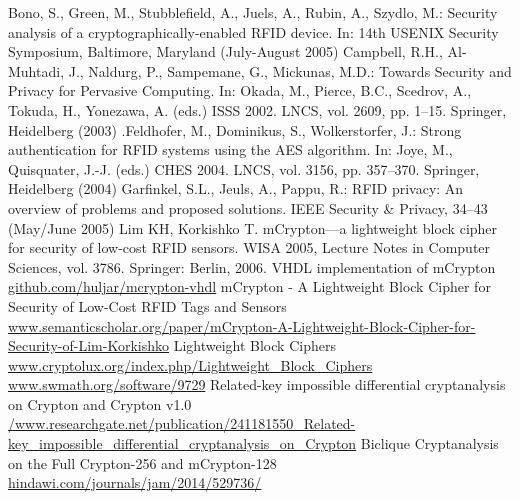 \documentclass{transcrypto}
\begin{document}
	\newpage
	\begin{thebibliography}{9}
		Bono, S., Green, M., Stubblefield, A., Juels, A., Rubin, A., Szydlo, M.: Security analysis of a cryptographically-enabled RFID device. In: 14th USENIX Security Symposium, Baltimore, Maryland (July-August 2005)
		Campbell, R.H., Al-Muhtadi, J., Naldurg, P., Sampemane, G., Mickunas, M.D.: Towards Security and Privacy for Pervasive Computing. In: Okada, M., Pierce, B.C., Scedrov, A., Tokuda, H., Yonezawa, A. (eds.) ISSS 2002. LNCS, vol. 2609, pp. 1–15. Springer, Heidelberg (2003)
		.Feldhofer, M., Dominikus, S., Wolkerstorfer, J.: Strong authentication for RFID systems using the AES algorithm. In: Joye, M., Quisquater, J.-J. (eds.) CHES 2004. LNCS, vol. 3156, pp. 357–370. Springer, Heidelberg (2004)
		Garfinkel, S.L., Jeuls, A., Pappu, R.: RFID privacy: An overview of problems and proposed solutions. IEEE Security \& Privacy, 34–43 (May/June 2005)
		Lim KH, Korkishko T. mCrypton—a lightweight block cipher for security of low-cost RFID sensors. WISA 2005, Lecture Notes in Computer Sciences, vol. 3786. Springer: Berlin, 2006. 
		VHDL implementation of mCrypton
		\href{https://github.com/huljar/mcrypton-vhdl}{github.com/huljar/mcrypton-vhdl}
		mCrypton - A Lightweight Block Cipher for Security of Low-Cost RFID Tags and Sensors
		\href{https://www.semanticscholar.org/paper/mCrypton-A-Lightweight-Block-Cipher-for-Security-of-Lim-Korkishko/7fca481caa31976a3c07989a295e804c1eeb9c76}{www.semanticscholar.org/paper/mCrypton-A-Lightweight-Block-Cipher-for-Security-of-Lim-Korkishko}
		Lightweight Block Ciphers
		\href{https://www.cryptolux.org/index.php/Lightweight_Block_Ciphers#mCrypton}{www.cryptolux.org/index.php/Lightweight\_Block\_Ciphers}
		\href{https://www.swmath.org/software/9729}{www.swmath.org/software/9729}
		Related-key impossible differential cryptanalysis on Crypton and Crypton v1.0
		\href{https://www.researchgate.net/publication/241181550_Related-key_impossible_differential_cryptanalysis_on_Crypton_and_Crypton_v10}{/www.researchgate.net/publication/241181550\_Related-key\_impossible\_differential\_cryptanalysis\_on\_Crypton}
		Biclique Cryptanalysis on the Full Crypton-256 and mCrypton-128
		\href{https://www.hindawi.com/journals/jam/2014/529736/}{hindawi.com/journals/jam/2014/529736/}
	\end{thebibliography}
\end{document}
